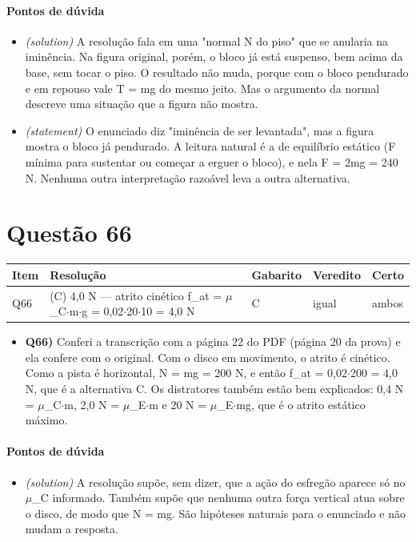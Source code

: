 \documentclass{article}%
\begin{document}
\paragraph{Pontos de dúvida}%
\begin{itemize}%
\item%
\textit{(solution)} A resolução fala em uma "normal N do piso" que se anularia na iminência. Na figura original, porém, o bloco já está suspenso, bem acima da base, sem tocar o piso. O resultado não muda, porque com o bloco pendurado e em repouso vale T = mg do mesmo jeito. Mas o argumento da normal descreve uma situação que a figura não mostra.%
\item%
\textit{(statement)} O enunciado diz "iminência de ser levantada", mas a figura mostra o bloco já pendurado. A leitura natural é a de equilíbrio estático (F mínima para sustentar ou começar a erguer o bloco), e nela F = 2mg = 240 N. Nenhuma outra interpretação razoável leva a outra alternativa.%
\end{itemize}%
\section*{Questão 66}%
\begin{longtable}{@{}p{} p{} p{} p{} p{}@{}}\toprule Item & Resolução & Gabarito & Veredito & Certo \\ \midrule
Q66 & (C) 4,0 N --- atrito cinético f\_at = $\mu$\_C$\cdot$m$\cdot$g = 0,02$\cdot$20$\cdot$10 = 4,0 N & C & igual & ambos \\
\bottomrule\end{longtable}%
\begin{itemize}%
\item%
\textbf{Q66)} Conferi a transcrição com a página 22 do PDF (página 20 da prova) e ela confere com o original. Com o disco em movimento, o atrito é cinético. Como a pista é horizontal, N = mg = 200 N, e então f\_at = 0,02$\cdot$200 = 4,0 N, que é a alternativa C. Os distratores também estão bem explicados: 0,4 N = $\mu$\_C$\cdot$m, 2,0 N = $\mu$\_E$\cdot$m e 20 N = $\mu$\_E$\cdot$mg, que é o atrito estático máximo.%
\end{itemize}%
\paragraph{Pontos de dúvida}%
\begin{itemize}%
\item%
\textit{(solution)} A resolução supõe, sem dizer, que a ação do esfregão aparece só no $\mu$\_C informado. Também supõe que nenhuma outra força vertical atua sobre o disco, de modo que N = mg. São hipóteses naturais para o enunciado e não mudam a resposta.%
\end{itemize}%
\end{document}
